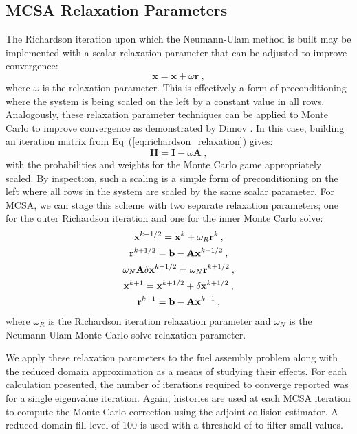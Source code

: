 \clearpage

\subsection{MCSA Relaxation Parameters}
\label{subsec:spn_mcsa_relaxation}
The Richardson iteration upon which the Neumann-Ulam method is built
may be implemented with a scalar relaxation parameter that can be
adjusted to improve convergence:
\begin{equation}
  \mathbf{x} = \mathbf{x} + \omega \mathbf{r}\:,
  \label{eq:richardson_relaxation}
\end{equation}
where $\omega$ is the relaxation parameter. This is effectively a form
of preconditioning where the system is being scaled on the left by a
constant value in all rows. Analogously, these relaxation parameter
techniques can be applied to Monte Carlo to improve convergence as
demonstrated by Dimov \citep{dimov_new_1998}. In this case, building
an iteration matrix from Eq~(\ref{eq:richardson_relaxation}) gives:
\begin{equation}
  \mathbf{H} = \mathbf{I} - \omega \mathbf{A}\:,
  \label{eq:relaxed_iteration_matrix}
\end{equation}
with the probabilities and weights for the Monte Carlo game
appropriately scaled. By inspection, such a scaling is a simple form
of preconditioning on the left where all rows in the system are scaled
by the same scalar parameter. For MCSA, we can stage this scheme with
two separate relaxation parameters; one for the outer Richardson
iteration and one for the inner Monte Carlo solve:
\begin{subequations}
  \begin{gather}
    \mathbf{x}^{k+1/2} = \mathbf{x}^k + \omega_R \mathbf{r}^k\:,\\ \mathbf{r}^{k+1/2}
    = \mathbf{b} -
    \mathbf{A}\mathbf{x}^{k+1/2}\:,\\ \omega_N\mathbf{A}\delta\mathbf{x}^{k+1/2} =
    \omega_N\mathbf{r}^{k+1/2}\:,\\ \mathbf{x}^{k+1} = \mathbf{x}^{k+1/2} + \delta
    \mathbf{x}^{k+1/2}\:,\\ \mathbf{r}^{k+1} = \mathbf{b} - \mathbf{A}\mathbf{x}^{k+1}\:,
  \end{gather}
  \label{eq:mcsa_relaxed}
\end{subequations}
where $\omega_R$ is the Richardson iteration relaxation parameter and
$\omega_N$ is the Neumann-Ulam Monte Carlo solve relaxation parameter.

We apply these relaxation parameters to the fuel assembly problem
along with the reduced domain approximation as a means of studying
their effects. For each calculation presented, the number of
iterations required to converge reported was for a single eigenvalue
iteration.  Again,  histories are used at each MCSA iteration
to compute the Monte Carlo correction using the adjoint collision
estimator. A reduced domain fill level of 100 is used with a threshold
of  to filter small values.

